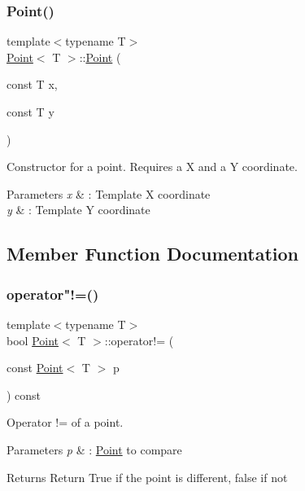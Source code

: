 \subsubsection{\texorpdfstring{Point()}{Point()}}
{\footnotesize\ttfamily template$<$typename T$>$ \\
\hyperlink{classPoint}{Point}$<$ T $>$\+::\hyperlink{classPoint}{Point} (\begin{DoxyParamCaption}\item[{const T}]{x,  }\item[{const T}]{y }\end{DoxyParamCaption})\hspace{0.3cm}{\ttfamily [inline]}}



Constructor for a point. Requires a X and a Y coordinate. 


\begin{DoxyParams}{Parameters}
{\em x} & \+: Template X coordinate \\
\hline
{\em y} & \+: Template Y coordinate \\
\hline
\end{DoxyParams}


\subsection{Member Function Documentation}
\mbox{\label{classPoint_accaa0100c0c631ad03280446a0b05339}} 
\subsubsection{\texorpdfstring{operator"!=()}{operator!=()}}
{\footnotesize\ttfamily template$<$typename T$>$ \\
bool \hyperlink{classPoint}{Point}$<$ T $>$\+::operator!= (\begin{DoxyParamCaption}\item[{const \hyperlink{classPoint}{Point}$<$ T $>$}]{p }\end{DoxyParamCaption}) const\hspace{0.3cm}{\ttfamily [inline]}}



Operator != of a point. 


\begin{DoxyParams}{Parameters}
{\em p} & \+: \hyperlink{classPoint}{Point} to compare \\
\hline
\end{DoxyParams}
\begin{DoxyReturn}{Returns}
Return True if the point is different, false if not 
\end{DoxyReturn}
\mbox{\label{classPoint_ac6b57554a6941b07668b52c66fe20fae}} 
